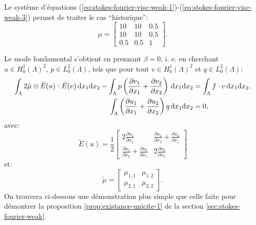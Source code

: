\begin{remarque}
Le système d'équations
(\ref{eq:stokes-fourier-visc-weak-1})-(\ref{eq:stokes-fourier-visc-weak-3})
permet de traiter le cas ``historique'':
\begin{equation}
  \mu = \begin{bmatrix}
    10 & 10 & 0.5\\
    10 & 10 & 0.5\\
    0.5 & 0.5 & 1
  \end{bmatrix}.
\end{equation}
\end{remarque}

\begin{remarque}
Le mode fondamental s'obtient en prennant $\beta = 0$, i. e. en
cherchant $u\in H_0^1(\Lambda)^2$, $p\in L_0^2(\Lambda)$, tels que
pour tout $v\in H_0^1(\Lambda)^2$ et $q\in L_0^2(\Lambda)$:
\begin{align}
  \int_\Lambda 2\tilde\mu\otimes \tilde E(u):\tilde E(v)\,\mathrm dx_1\mathrm dx_2 %
  - \int_\Lambda p\parent{\frac{\partial v_1}{\partial x_1} %
                          + \frac{\partial v_2}{\partial x_2}}\,\mathrm dx_1\mathrm dx_2 %
  &= \int_\Lambda f\cdot v\,\mathrm dx_1\mathrm dx_2,\\
  \int_\Lambda \parent{\frac{\partial u_1}{\partial x_1} %
    + \frac{\partial u_2}{\partial x_2}}q \,\mathrm dx_1\mathrm dx_2 %
  &= 0,
\end{align}
avec:
\begin{equation}\label{eq:stokes-fourier-strain-tensor-2d}
  \tilde E(u) = \frac{1}{2}\begin{bmatrix}
    2 \frac{\partial u_1}{\partial x_1} %
    & \frac{\partial u_1}{\partial x_2} + \frac{\partial u_2}{\partial x_1}\\
    \frac{\partial u_1}{\partial x_2} + \frac{\partial u_2}{\partial x_1} %
    & 2 \frac{\partial u_2}{\partial x_2}
  \end{bmatrix}
\end{equation}
et:
\begin{equation}\label{eq:stokes-fourier-visc-tensor-2d}
\tilde \mu = \begin{bmatrix}
  \mu_{1,1} & \mu_{1,2}\\
  \mu_{2,1} & \mu_{2,2}
\end{bmatrix}.
\end{equation}
On trouvera ci-dessous une démonstration plus simple que celle faite
pour démontrer la proposition \ref{prop:existance-unicite-1} de la
section \ref{sec:stokes-fourier-weak}.
\end{remarque}

